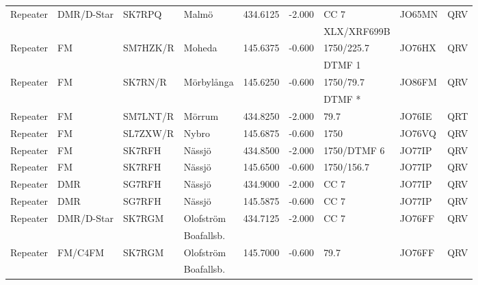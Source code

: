 \begin{longtable}{llllrrlll}
Repeater & DMR/D-Star      & SK7RPQ   & Malmö        & 434.6125     & -2.000     & CC 7         & JO65MN      & QRV      \\
         &                 &          &              &              &            & XLX/XRF699B  &             &          \\
Repeater & FM              & SM7HZK/R & Moheda       & 145.6375     & -0.600     & 1750/225.7   & JO76HX      & QRV      \\
         &                 &          &              &              &            & DTMF 1       &             &          \\
Repeater & FM              & SK7RN/R  & Mörbylånga   & 145.6250     & -0.600     & 1750/79.7    & JO86FM      & QRV      \\
         &                 &          &              &              &            & DTMF *       &             &          \\
Repeater & FM              & SM7LNT/R & Mörrum       & 434.8250     & -2.000     & 79.7         & JO76IE      & QRT      \\
Repeater & FM              & SL7ZXW/R & Nybro        & 145.6875     & -0.600     & 1750         & JO76VQ      & QRV      \\
Repeater & FM              & SK7RFH   & Nässjö       & 434.8500     & -2.000     & 1750/DTMF 6  & JO77IP      & QRV      \\
Repeater & FM              & SK7RFH   & Nässjö       & 145.6500     & -0.600     & 1750/156.7   & JO77IP      & QRV      \\
Repeater & DMR             & SG7RFH   & Nässjö       & 434.9000     & -2.000     & CC 7         & JO77IP      & QRV      \\
Repeater & DMR             & SG7RFH   & Nässjö       & 145.5875     & -0.600     & CC 7         & JO77IP      & QRV      \\
Repeater & DMR/D-Star      & SK7RGM   & Olofström    & 434.7125     & -2.000     & CC 7         & JO76FF      & QRV      \\
         &                 &          & Boafallsb.   &              &            &              &             &          \\
Repeater & FM/C4FM         & SK7RGM   & Olofström    & 145.7000     & -0.600     & 79.7         & JO76FF      & QRV      \\
         &                 &          & Boafallsb.   &              &            &              &             &          \\

\end{longtable}

